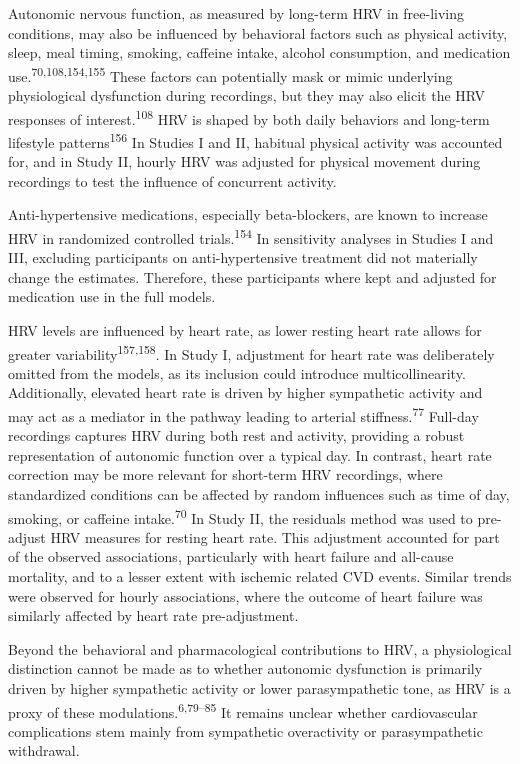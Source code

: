 \documentclass[
  a4paper,
  headsepline=true,
  open=left]{scrbook}
\begin{document}
Autonomic nervous function, as measured by long-term HRV in free-living
conditions, may also be influenced by behavioral factors such as
physical activity, sleep, meal timing, smoking, caffeine intake, alcohol
consumption, and medication use.\textsuperscript{70,108,154,155} These
factors can potentially mask or mimic underlying physiological
dysfunction during recordings, but they may also elicit the HRV
responses of interest.\textsuperscript{108} HRV is shaped by both daily
behaviors and long-term lifestyle patterns\textsuperscript{156} In
Studies I and II, habitual physical activity was accounted for, and in
Study II, hourly HRV was adjusted for physical movement during
recordings to test the influence of concurrent activity.

Anti-hypertensive medications, especially beta-blockers, are known to
increase HRV in randomized controlled trials.\textsuperscript{154} In
sensitivity analyses in Studies I and III, excluding participants on
anti-hypertensive treatment did not materially change the estimates.
Therefore, these participants where kept and adjusted for medication use
in the full models.

HRV levels are influenced by heart rate, as lower resting heart rate
allows for greater variability\textsuperscript{157,158}. In Study I,
adjustment for heart rate was deliberately omitted from the models, as
its inclusion could introduce multicollinearity. Additionally, elevated
heart rate is driven by higher sympathetic activity and may act as a
mediator in the pathway leading to arterial
stiffness.\textsuperscript{77} Full-day recordings captures HRV during
both rest and activity, providing a robust representation of autonomic
function over a typical day. In contrast, heart rate correction may be
more relevant for short-term HRV recordings, where standardized
conditions can be affected by random influences such as time of day,
smoking, or caffeine intake.\textsuperscript{70} In Study II, the
residuals method was used to pre-adjust HRV measures for resting heart
rate. This adjustment accounted for part of the observed associations,
particularly with heart failure and all-cause mortality, and to a lesser
extent with ischemic related CVD events. Similar trends were observed
for hourly associations, where the outcome of heart failure was
similarly affected by heart rate pre-adjustment.

Beyond the behavioral and pharmacological contributions to HRV, a
physiological distinction cannot be made as to whether autonomic
dysfunction is primarily driven by higher sympathetic activity or lower
parasympathetic tone, as HRV is a proxy of these
modulations.\textsuperscript{6,79--85} It remains unclear whether
cardiovascular complications stem mainly from sympathetic overactivity
or parasympathetic withdrawal.
\end{document}
